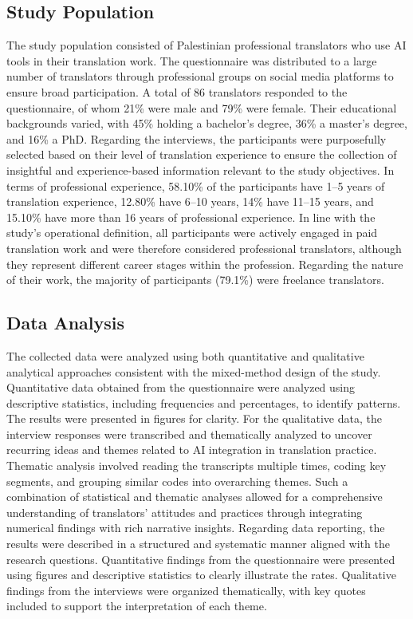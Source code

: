 \documentclass[english]{textolivre}
\begin{document}
\subsection{Study Population}\label{sec-idioma}
The study population consisted of Palestinian professional translators who use AI tools in their translation work. The questionnaire was distributed to a large number of translators through professional groups on social media platforms to ensure broad participation. A total of 86 translators responded to the questionnaire, of whom 21\% were male and 79\% were female. Their educational backgrounds varied, with 45\% holding a bachelor’s degree, 36\% a master’s degree, and 16\% a PhD. Regarding the interviews, the participants were purposefully selected based on their level of translation experience to ensure the collection of insightful and experience-based information relevant to the study objectives. In terms of professional experience, 58.10\% of the participants have 1–5 years of translation experience, 12.80\% have 6–10 years, 14\% have 11–15 years, and 15.10\% have more than 16 years of professional experience. In line with the study’s operational definition, all participants were actively engaged in paid translation work and were therefore considered professional translators, although they represent different career stages within the profession. Regarding the nature of their work, the majority of participants (79.1\%) were freelance translators.

\subsection{Data Analysis}\label{sec-resumo}
The collected data were analyzed using both quantitative and qualitative analytical approaches consistent with the mixed-method design of the study. Quantitative data obtained from the questionnaire were analyzed using descriptive statistics, including frequencies and percentages, to identify patterns. The results were presented in figures for clarity. For the qualitative data, the interview responses were transcribed and thematically analyzed to uncover recurring ideas and themes related to AI integration in translation practice. Thematic analysis involved reading the transcripts multiple times, coding key segments, and grouping similar codes into overarching themes. Such a combination of statistical and thematic analyses allowed for a comprehensive understanding of translators’ attitudes and practices through integrating numerical findings with rich narrative insights. Regarding data reporting, the results were described in a structured and systematic manner aligned with the research questions. Quantitative findings from the questionnaire were presented using figures and descriptive statistics to clearly illustrate the rates. Qualitative findings from the interviews were organized thematically, with key quotes included to support the interpretation of each theme.
\end{document}
